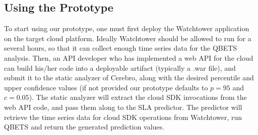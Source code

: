 \subsection{Using the Prototype}
To start using our prototype, one must first deploy the Watchtower application on the target cloud platform. 
Ideally Watchtower should be allowed to run for a several hours,
so that it can collect enough time series data for the QBETS analysis. Then,
an API developer who has implemented a web API for the cloud can build his/her code into a deployable
artifact (typically a .war file), and submit it to the static analyzer of Cerebro, along with the desired percentile
and upper confidence values (if not provided our prototype defaults to $p=95$ and $c=0.05$). 
The static analyzer will extract
the cloud SDK invocations from the web API code, and pass them along to the SLA predictor. The predictor
will retrieve the time series data for cloud SDK operations from Watchtower, run QBETS and return the
generated prediction values.